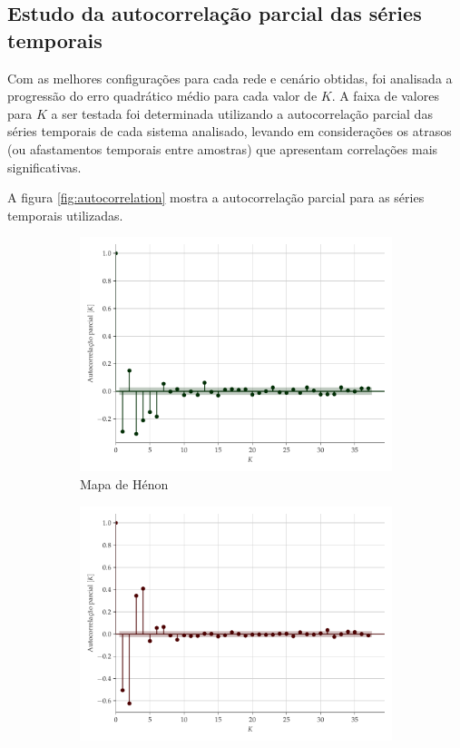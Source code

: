 \documentclass[a4paper, 12pt]{article}
\begin{document}
\subsection{Estudo da autocorrelação parcial das séries temporais}

Com as melhores configurações para cada rede e cenário obtidas, foi analisada a progressão do erro quadrático médio para cada valor de $K$. A faixa de valores para $K$ a ser testada foi determinada utilizando a autocorrelação parcial das séries temporais de cada sistema analisado, levando em considerações os atrasos (ou afastamentos temporais entre amostras) que apresentam correlações mais significativas. 

A figura \ref{fig:autocorrelation} mostra a autocorrelação parcial para as séries temporais utilizadas.
\begin{figure}[H]
     \begin{subfigure}[t]{0.4\textwidth}
         \includegraphics[scale=0.35]{autocorrelacao-parcial-henon.pdf}
         \caption{Mapa de Hénon}
     \end{subfigure}
     \centering
     \begin{subfigure}[t]{0.4\textwidth} 
         \includegraphics[scale=0.35]{autocorrelacao-parcial-logistic.pdf}

\end{subfigure}
\end{figure}
\end{document}
